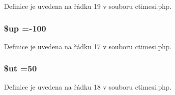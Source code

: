 Definice je uvedena na řádku 19 v souboru ctimesi.\-php.

\hypertarget{ctimesi_8php_a6b5ad2ac55f9df46e8f34e78fbd6f176}{
\subsubsection[{\$up}]{\setlength{\rightskip}{0pt plus 5cm}\$up =-\/100}}\label{ctimesi_8php_a6b5ad2ac55f9df46e8f34e78fbd6f176}


Definice je uvedena na řádku 17 v souboru ctimesi.\-php.

\hypertarget{ctimesi_8php_aadd3f841051043ee58e587e840e8dd0b}{
\subsubsection[{\$ut}]{\setlength{\rightskip}{0pt plus 5cm}\$ut =50}}\label{ctimesi_8php_aadd3f841051043ee58e587e840e8dd0b}


Definice je uvedena na řádku 18 v souboru ctimesi.\-php.

